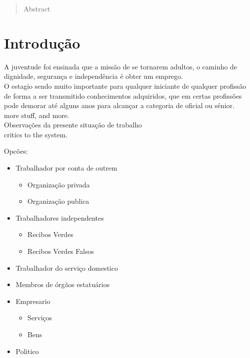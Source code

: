 

\tableofcontents
\appendix
\pagestyle{plain} %
\captionsetup{justification = raggedright, singlelinecheck = false}
\setlength{\parindent}{0in}
\label{Resumo}
\begin{abstract}
Abstract
\end{abstract}
\newpage
\section{Introdução}
\qquad A juventude foi ensinada que a missão de se tornarem adultos, o caminho de dignidade, segurança e independência é obter um emprego.\\
O estagio sendo muito importante para qualquer iniciante de qualquer profissão de forma a ser transmitido conhecimentos adquiridos, que em certas profissões pode demorar até alguns anos para alcançar a categoria de oficial ou sénior.\\

more stuff, and more.\\

{\Large Observações da presente situação de trabalho} \\

critics to the system.

\begin{minipage}[t]{\linewidth}
\quad Opcões:
\begin{itemize}
\setlength\itemsep{-0.3em}
\item Trabalhador por conta de outrem
\begin{itemize}
\item Organização privada
\item Organização publica
\end{itemize}
\item Trabalhadores independentes
\begin{itemize}
\item Recibos Verdes
\item Recibos Verdes Falsos
\end{itemize}
\newpage
\item Trabalhador do serviço domestico
\item Membros de órgãos estatuários
\item Empresario
\begin{itemize}
\item Serviços
\item Bens
\end{itemize}
\item Politico\\ \\
\end{itemize}
\end{minipage}\par




